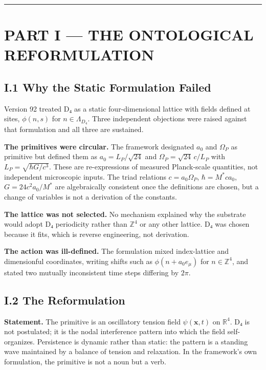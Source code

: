\documentclass[a4paper,11pt]{article}
\begin{document}
\medskip\hrule\medskip

\section*{PART I — THE ONTOLOGICAL REFORMULATION}

\subsection*{I.1 Why the Static Formulation Failed}

Version 92 treated D₄ as a static four-dimensional lattice with fields defined at sites, $\phi(n,s)$ for $n\in\Lambda_{D_4}$. Three independent objections were raised against that formulation and all three are sustained.

\textbf{The primitives were circular.} The framework designated $a_0$ and $\Omega_P$ as primitive but defined them as $a_0=L_P/\sqrt{24}$ and $\Omega_P=\sqrt{24}\,c/L_P$ with $L_P=\sqrt{\hbar G/c^3}$. These are re-expressions of measured Planck-scale quantities, not independent microscopic inputs. The triad relations $c=a_0\Omega_P$, $\hbar=M^{*}ca_0$, $G=24c^2a_0/M^{*}$ are algebraically consistent once the definitions are chosen, but a change of variables is not a derivation of the constants.

\textbf{The lattice was not selected.} No mechanism explained why the substrate would adopt D₄ periodicity rather than $\mathbb{Z}^4$ or any other lattice. D₄ was chosen because it fits, which is reverse engineering, not derivation.

\textbf{The action was ill-defined.} The formulation mixed index-lattice and dimensionful coordinates, writing shifts such as $\phi(n+a_0e_\mu)$ for $n\in\mathbb{Z}^4$, and stated two mutually inconsistent time steps differing by $2\pi$.

\subsection*{I.2 The Reformulation}

\textbf{Statement.} The primitive is an oscillatory tension field $\psi(\mathbf{x},t)$ on $\mathbb{R}^4$. D₄ is not postulated; it is the nodal interference pattern into which the field self-organizes. Persistence is dynamic rather than static: the pattern is a standing wave maintained by a balance of tension and relaxation. In the framework's own formulation, the primitive is not a noun but a verb.
\end{document}
